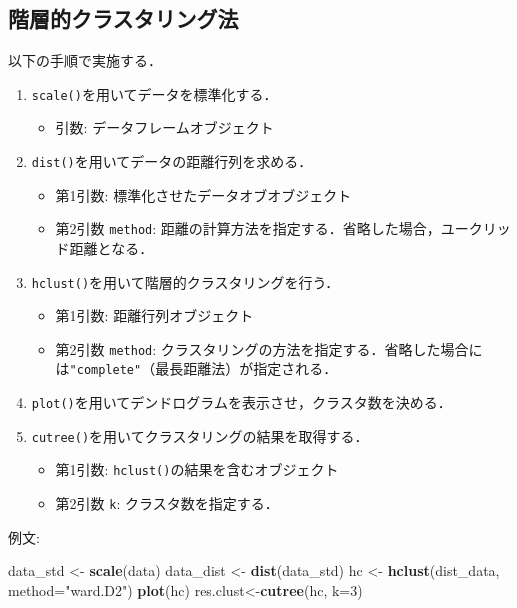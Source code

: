 \documentclass[
  xelatex, ja=standard]{bxjsarticle}
\newenvironment{Shaded}{\begin{snugshade}}{\end{snugshade}}
\newcommand{\AttributeTok}[1]{\textcolor[rgb]{0.13,0.29,0.53}{#1}}
\newcommand{\DecValTok}[1]{\textcolor[rgb]{0.00,0.00,0.81}{#1}}
\newcommand{\FunctionTok}[1]{\textcolor[rgb]{0.13,0.29,0.53}{\textbf{#1}}}
\newcommand{\NormalTok}[1]{#1}
\newcommand{\OtherTok}[1]{\textcolor[rgb]{0.56,0.35,0.01}{#1}}
\newcommand{\StringTok}[1]{\textcolor[rgb]{0.31,0.60,0.02}{#1}}
\providecommand{\tightlist}{%
  \setlength{\itemsep}{0pt}\setlength{\parskip}{0pt}}
\begin{document}
\subsection{階層的クラスタリング法}\label{ux968eux5c64ux7684ux30afux30e9ux30b9ux30bfux30eaux30f3ux30b0ux6cd5}

以下の手順で実施する．

\begin{enumerate}
\def\labelenumi{\arabic{enumi}.}
\tightlist
\item
  \texttt{scale()}を用いてデータを標準化する．

  \begin{itemize}
  \tightlist
  \item
    引数: データフレームオブジェクト
  \end{itemize}
\item
  \texttt{dist()}を用いてデータの距離行列を求める．

  \begin{itemize}
  \tightlist
  \item
    第1引数: 標準化させたデータオブオブジェクト
  \item
    第2引数 \texttt{method}:
    距離の計算方法を指定する．省略した場合，ユークリッド距離となる．
  \end{itemize}
\item
  \texttt{hclust()}を用いて階層的クラスタリングを行う．

  \begin{itemize}
  \tightlist
  \item
    第1引数: 距離行列オブジェクト
  \item
    第2引数 \texttt{method}:
    クラスタリングの方法を指定する．省略した場合には\texttt{"complete"}（最長距離法）が指定される．
  \end{itemize}
\item
  \texttt{plot()}を用いてデンドログラムを表示させ，クラスタ数を決める．
\item
  \texttt{cutree()}を用いてクラスタリングの結果を取得する．

  \begin{itemize}
  \tightlist
  \item
    第1引数: \texttt{hclust()}の結果を含むオブジェクト
  \item
    第2引数 \texttt{k}: クラスタ数を指定する．
  \end{itemize}
\end{enumerate}

例文:

\begin{Shaded}
\begin{Highlighting}[]
\NormalTok{data\_std }\OtherTok{\textless{}{-}} \FunctionTok{scale}\NormalTok{(data)}
\NormalTok{data\_dist }\OtherTok{\textless{}{-}} \FunctionTok{dist}\NormalTok{(data\_std)}
\NormalTok{hc }\OtherTok{\textless{}{-}} \FunctionTok{hclust}\NormalTok{(dist\_data, }\AttributeTok{method=}\StringTok{"ward.D2"}\NormalTok{)}
\FunctionTok{plot}\NormalTok{(hc)}
\NormalTok{res.clust}\OtherTok{\textless{}{-}}\FunctionTok{cutree}\NormalTok{(hc, }\AttributeTok{k=}\DecValTok{3}\NormalTok{)}
\end{Highlighting}
\end{Shaded}
\end{document}
